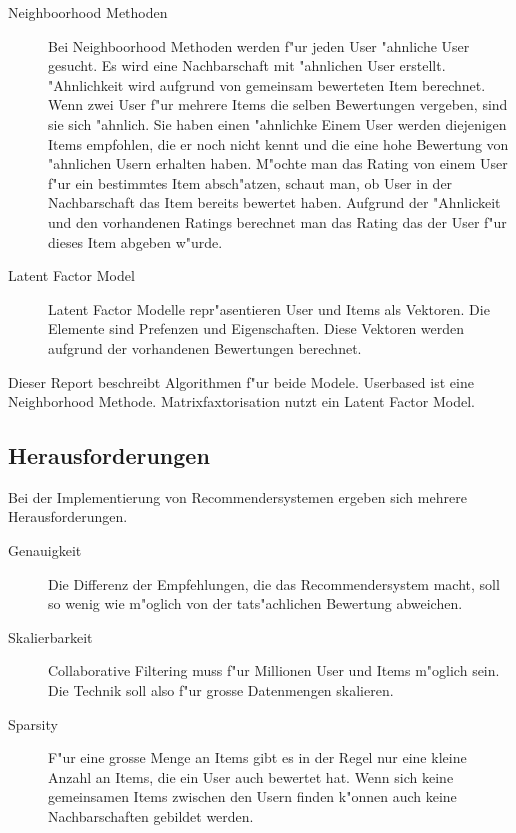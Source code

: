 \documentclass[a4paper, 12pt]{article}
\begin{document}
\begin{description}
\item[Neighboorhood Methoden] Bei Neighboorhood Methoden werden f"ur jeden User "ahnliche User gesucht. Es wird eine Nachbarschaft mit "ahnlichen User erstellt.
"Ahnlichkeit wird aufgrund von gemeinsam bewerteten Item berechnet. Wenn zwei User f"ur mehrere Items die selben Bewertungen vergeben, sind sie sich "ahnlich. Sie haben einen "ahnlichke Einem User werden diejenigen Items empfohlen, die er noch nicht kennt und die eine hohe Bewertung von "ahnlichen Usern erhalten haben.
M"ochte man das Rating von einem User f"ur ein bestimmtes Item ab\-sch"atz\-en, schaut man, ob User in der Nachbarschaft das Item bereits bewertet haben. Aufgrund der "Ahnlickeit und den vorhandenen Ratings berechnet man das Rating das der User f"ur dieses Item abgeben w"urde.
\item[Latent Factor Model] Latent Factor Modelle repr"asentieren User und Items als Vektoren. Die Elemente sind Prefenzen und Eigenschaften. Diese Vektoren werden aufgrund der vorhandenen Bewertungen berechnet.
\end{description}

Dieser Report beschreibt Algorithmen f"ur beide Modele. Userbased ist eine Neighborhood Methode. Matrixfaxtorisation nutzt ein Latent Factor Model.

\subsection{Herausforderungen}
\label{sec:challenges}

Bei der Implementierung von Recommendersystemen ergeben sich mehrere Herausforderungen.

\begin{description}
\item[Genauigkeit] Die Differenz der Empfehlungen, die das Recommendersystem macht, soll so wenig wie m"oglich von der tats"achlichen Bewertung abweichen.
\item[Skalierbarkeit] 
Collaborative Filtering muss f"ur Millionen User und Items m"oglich sein. Die Technik soll also f"ur grosse Datenmengen skalieren.
\item[Sparsity] F"ur eine grosse Menge an Items gibt es in der Regel nur eine kleine Anzahl an Items, die ein User auch bewertet hat. Wenn sich keine gemeinsamen Items zwischen den Usern finden k"onnen auch keine Nachbarschaften gebildet werden.
\end{description}
\end{document}
